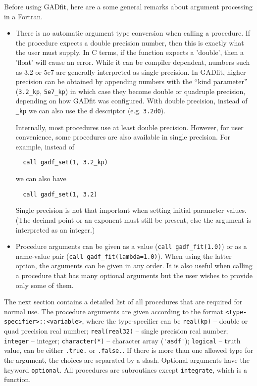 \documentclass{article}
\begin{document}
Before using GADfit, here are a some general remarks about argument processing in a Fortran.
\begin{itemize}
\item There is no automatic argument type conversion when calling a procedure. If the procedure expects a double precision number, then this is exactly what the user must supply. In C terms, if the function expects a 'double', then a 'float' will cause an error. While it can be compiler dependent, numbers such as 3.2 or 5e7 are generally interpreted as single precision. In GADfit, higher precision can be obtained by appending numbers with the ``kind parameter'' (\verb+3.2_kp+, \verb+5e7_kp+) in which case they become double or quadruple precision, depending on how GADfit was configured. With double precision, instead of \verb+_kp+ we can also use the \texttt{d} descriptor (e.g. \texttt{3.2d0}).

Internally, most procedures use at least double precision. However, for user convenience, some procedures are also available in single precision. For example, instead of
\begin{verbatim}
  call gadf_set(1, 3.2_kp)
\end{verbatim}
  we can also have
\begin{verbatim}
  call gadf_set(1, 3.2)
\end{verbatim}
  Single precision is not that important when setting initial parameter values. (The decimal point or an exponent must still be present, else the argument is interpreted as an integer.)

\item Procedure arguments can be given as a value (\verb+call gadf_fit(1.0)+) or as a name-value pair (\verb+call gadf_fit(lambda=1.0)+). When using the latter option, the arguments can be given in any order. It is also useful when calling a procedure that has many optional arguments but the user wishes to provide only some of them.
\end{itemize}
The next section contains a detailed list of all procedures that are required for normal use. The procedure arguments are given according to the format \verb+<type-specifier>::<variable>+, where the type-specifier can be \verb+real(kp)+ -- double or quad precision real number; \verb+real(real32)+ -- single precision real number; \verb+integer+ -- integer; \verb+character(*)+ -- character array (\verb+'asdf'+); \verb+logical+ -- truth value, can be either \verb+.true.+ or \verb+.false.+. If there is more than one allowed type for the argument, the choices are separated by a slash. Optional arguments have the keyword \verb+optional+. All procedures are subroutines except \verb+integrate+, which is a function.
\end{document}
